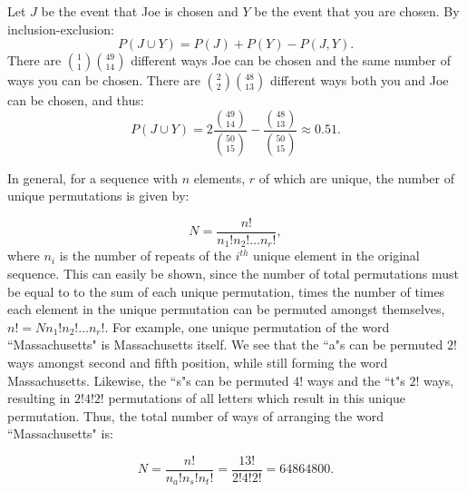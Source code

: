 \begin{problem}{7} Let $J$ be the event that Joe is chosen and $Y$ be the event that you are chosen.  By inclusion-exclusion:
\begin{equation*}
P(J \cup Y) = P(J)+P(Y)-P(J, Y).
\end{equation*}
There are $\binom{1}{1}\binom{49}{14}$ different ways Joe can be chosen and the same number of ways you can be chosen.  There are $\binom{2}{2}\binom{48}{13}$ different ways both you and Joe can be chosen, and thus: 
\begin{equation*}
P(J \cup Y) = 2\frac{\binom{49}{14}}{\binom{50}{15}}-\frac{\binom{48}{13}}{\binom{50}{15}}  \approx 0.51.
\end{equation*}
\end{problem}

\begin{problem}{8} In general, for a sequence with $n$ elements, $r$ of which are unique, the number of unique permutations is given by:

\begin{equation}
N = \frac{n!}{n_1!n_2!\ldots n_r!}, 
\end{equation}
where $n_i$ is the number of repeats of the $i^{th}$ unique element in the original sequence.  This can easily be shown, since the number of total permutations must be equal to to the sum of each unique permutation, times the number of times each element in the unique permutation can be permuted amongst themselves, $n! = N n_1!n_2!\ldots n_r!$.  For example, one unique permutation of the word ``Massachusetts" is Massachusetts itself.  We see that the ``a"s can be permuted $2!$ ways amongst second and fifth position, while still forming the word Massachusetts.  Likewise, the ``s"s can be permuted $4!$ ways and the ``t"s $2!$ ways, resulting in $2!4!2!$ permutations of all letters which result in this unique permutation.  Thus, the total number of ways of arranging the word ``Massachusetts" is:

\begin{equation}
N = \frac{n!}{n_a!n_s!n_t!} =\frac{13!}{2!4!2!}= 64864800. 
\end{equation}


\end{problem}


